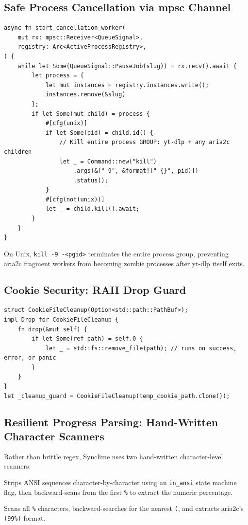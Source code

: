 \documentclass[10pt,letterpaper]{article}
\begin{document}
\subsection{Safe Process Cancellation via mpsc Channel}

\begin{lstlisting}[caption={Cancellation worker (lib.rs)}]
async fn start_cancellation_worker(
    mut rx: mpsc::Receiver<QueueSignal>,
    registry: Arc<ActiveProcessRegistry>,
) {
    while let Some(QueueSignal::PauseJob(slug)) = rx.recv().await {
        let process = {
            let mut instances = registry.instances.write();
            instances.remove(&slug)
        };
        if let Some(mut child) = process {
            #[cfg(unix)]
            if let Some(pid) = child.id() {
                // Kill entire process GROUP: yt-dlp + any aria2c children
                let _ = Command::new("kill")
                    .args(&["-9", &format!("-{}", pid)])
                    .status();
            }
            #[cfg(not(unix))]
            let _ = child.kill().await;
        }
    }
}
\end{lstlisting}

On Unix, \texttt{kill -9 -<pgid>} terminates the entire process group, preventing aria2c
fragment workers from becoming zombie processes after yt-dlp itself exits.

\subsection{Cookie Security: RAII Drop Guard}

\begin{lstlisting}[caption={Cookie file RAII cleanup (engine/process.rs)}]
struct CookieFileCleanup(Option<std::path::PathBuf>);
impl Drop for CookieFileCleanup {
    fn drop(&mut self) {
        if let Some(ref path) = self.0 {
            let _ = std::fs::remove_file(path); // runs on success, error, or panic
        }
    }
}
let _cleanup_guard = CookieFileCleanup(temp_cookie_path.clone());
\end{lstlisting}

\subsection{Resilient Progress Parsing: Hand-Written Character Scanners}

Rather than brittle regex, Synclime uses two hand-written character-level scanners:

\begin{description}[style=nextline, leftmargin=1.6em]
  \item[\texttt{parse\_progress\_line}] Strips ANSI sequences character-by-character using
        an \texttt{in\_ansi} state machine flag, then backward-scans from the first
        \texttt{\%} to extract the numeric percentage.
  \item[\texttt{parse\_aria2\_progress}] Scans all \texttt{\%} characters, backward-searches
        for the nearest \texttt{(}, and extracts aria2c's \texttt{(99\%)} format.
\end{description}
\end{document}
